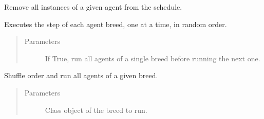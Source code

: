 \documentclass[letterpaper,10pt,english]{sphinxmanual}
\begin{document}
\begin{fulllineitems}
\begin{fulllineitems}
\label{\detokenize{index:examples.sugarscape_cg.sugarscape_cg.schedule.RandomActivationByBreed.remove}}
Remove all instances of a given agent from the schedule.

\end{fulllineitems}


\begin{fulllineitems}
\label{\detokenize{index:examples.sugarscape_cg.sugarscape_cg.schedule.RandomActivationByBreed.step}}
Executes the step of each agent breed, one at a time, in random order.
\begin{quote}\begin{description}
\item[{Parameters}] \leavevmode
{} \textendash{} If True, run all agents of a single breed before running
the next one.

\end{description}\end{quote}

\end{fulllineitems}


\begin{fulllineitems}
\label{\detokenize{index:examples.sugarscape_cg.sugarscape_cg.schedule.RandomActivationByBreed.step_breed}}
Shuffle order and run all agents of a given breed.
\begin{quote}\begin{description}
\item[{Parameters}] \leavevmode
{} \textendash{} Class object of the breed to run.

\end{description}\end{quote}

\end{fulllineitems}


\end{fulllineitems}
\end{document}
